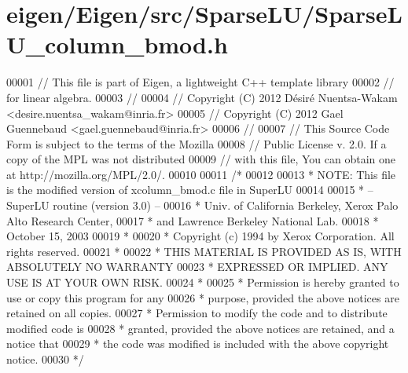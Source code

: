 \hypertarget{eigen_2_eigen_2src_2_sparse_l_u_2_sparse_l_u__column__bmod_8h_source}{}\section{eigen/\+Eigen/src/\+Sparse\+L\+U/\+Sparse\+L\+U\+\_\+column\+\_\+bmod.h}
\label{eigen_2_eigen_2src_2_sparse_l_u_2_sparse_l_u__column__bmod_8h_source}

\begin{DoxyCode}
00001 \textcolor{comment}{// This file is part of Eigen, a lightweight C++ template library}
00002 \textcolor{comment}{// for linear algebra.}
00003 \textcolor{comment}{//}
00004 \textcolor{comment}{// Copyright (C) 2012 Désiré Nuentsa-Wakam <desire.nuentsa\_wakam@inria.fr>}
00005 \textcolor{comment}{// Copyright (C) 2012 Gael Guennebaud <gael.guennebaud@inria.fr>}
00006 \textcolor{comment}{//}
00007 \textcolor{comment}{// This Source Code Form is subject to the terms of the Mozilla}
00008 \textcolor{comment}{// Public License v. 2.0. If a copy of the MPL was not distributed}
00009 \textcolor{comment}{// with this file, You can obtain one at http://mozilla.org/MPL/2.0/.}
00010 
00011 \textcolor{comment}{/* }
00012 \textcolor{comment}{ }
00013 \textcolor{comment}{ * NOTE: This file is the modified version of xcolumn\_bmod.c file in SuperLU }
00014 \textcolor{comment}{ }
00015 \textcolor{comment}{ * -- SuperLU routine (version 3.0) --}
00016 \textcolor{comment}{ * Univ. of California Berkeley, Xerox Palo Alto Research Center,}
00017 \textcolor{comment}{ * and Lawrence Berkeley National Lab.}
00018 \textcolor{comment}{ * October 15, 2003}
00019 \textcolor{comment}{ *}
00020 \textcolor{comment}{ * Copyright (c) 1994 by Xerox Corporation.  All rights reserved.}
00021 \textcolor{comment}{ *}
00022 \textcolor{comment}{ * THIS MATERIAL IS PROVIDED AS IS, WITH ABSOLUTELY NO WARRANTY}
00023 \textcolor{comment}{ * EXPRESSED OR IMPLIED.  ANY USE IS AT YOUR OWN RISK.}
00024 \textcolor{comment}{ *}
00025 \textcolor{comment}{ * Permission is hereby granted to use or copy this program for any}
00026 \textcolor{comment}{ * purpose, provided the above notices are retained on all copies.}
00027 \textcolor{comment}{ * Permission to modify the code and to distribute modified code is}
00028 \textcolor{comment}{ * granted, provided the above notices are retained, and a notice that}
00029 \textcolor{comment}{ * the code was modified is included with the above copyright notice.}
00030 \textcolor{comment}{ */}

\end{DoxyCode}

